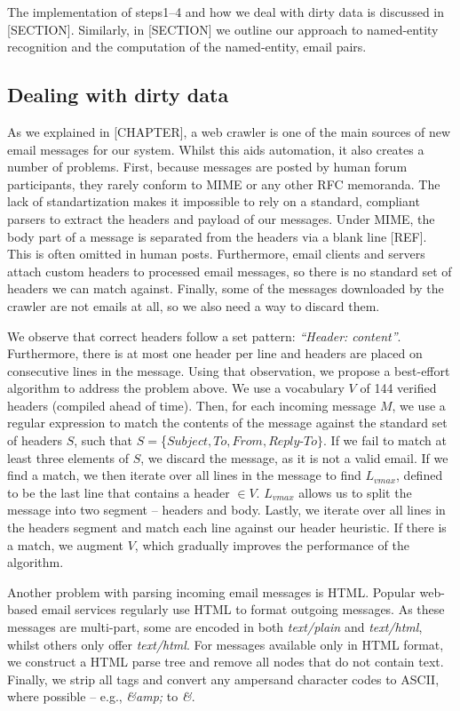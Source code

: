 The implementation of steps1--4 and how we deal with dirty data is discussed in [SECTION]. Similarly, in [SECTION] we outline our approach to named-entity recognition and the computation of the named-entity, email pairs.

\subsection{Dealing with dirty data}
As we explained in [CHAPTER], a web crawler is one of the main sources of new email messages for our system. Whilst this aids automation, it also creates a number of problems. First, because messages are posted by human forum participants, they rarely conform to MIME or any other RFC memoranda. The lack of standartization makes it impossible to rely on a standard, compliant parsers to extract the headers and payload of our messages. Under MIME, the body part of a message is separated from the headers via a blank line [REF]. This is often omitted in human posts. Furthermore, email clients and servers attach custom headers to processed email messages, so there is no standard set of headers we can match against. Finally, some of the messages downloaded by the crawler are not emails at all, so we also need a way to discard them.

We observe that correct headers follow a set pattern: \textit{``Header: content''}. Furthermore, there is at most one header per line and headers are placed on consecutive lines in the message. Using that observation, we propose a best-effort algorithm to address the problem above. We use a vocabulary $V$ of 144 verified headers (compiled ahead of time). Then, for each incoming message $M$, we use a regular expression to match the contents of the message against the standard set of headers $S$, such that $S = $\{$Subject, To, From, Reply$-$To\}$. If we fail to match at least three elements of $S$, we discard the message, as it is not a valid email. If we find a match, we then iterate over all lines in the message to find $L_{vmax}$, defined to be the last line that contains a header $\in V$. $L_{vmax}$ allows us to split the message into two segment -- headers and body. Lastly, we iterate over all lines in the headers segment and match each line against our header heuristic. If there is a match, we augment $V$, which gradually improves the performance of the algorithm.

Another problem with parsing incoming email messages is HTML. Popular web-based email services regularly use HTML to format outgoing messages. As these messages are multi-part, some are encoded in both \emph{text/plain} and \emph{text/html}, whilst others only offer \emph{text/html}. For messages available only in HTML format, we construct a HTML parse tree and remove all nodes that do not contain text. Finally, we strip all tags and convert any ampersand character codes to ASCII, where possible -- e.g.,  \emph{\&amp;} to \emph{\&}.

